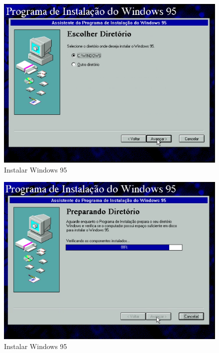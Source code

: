 \documentclass{report}
\begin{document}
\begin{figure}
\centering
\includegraphics[width=\textwidth]{Screenshot_32.png}
\caption{Instalar Windows 95}
\label{fig:32}
\end{figure}

\begin{figure}
\centering
\includegraphics[width=\textwidth]{Screenshot_33.png}
\caption{Instalar Windows 95}
\label{fig:33}
\end{figure}
\end{document}
